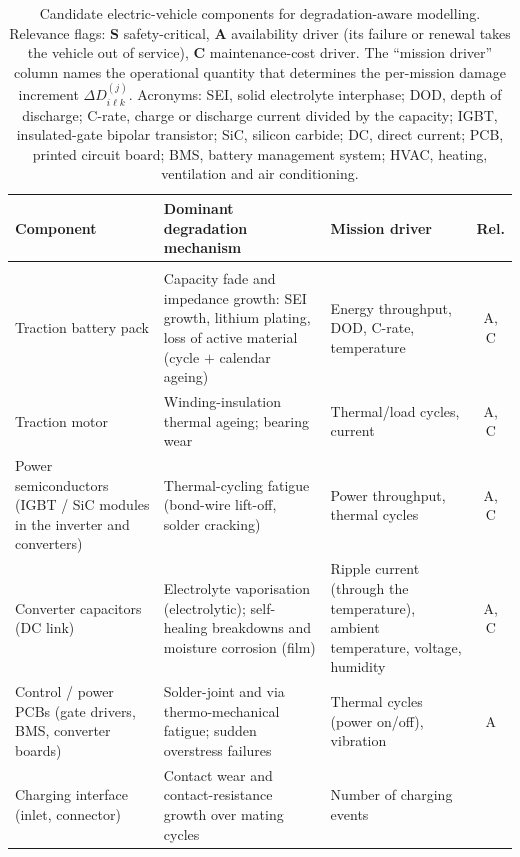 \documentclass[11pt,a4paper]{article}
\theoremstyle{plain}
\theoremstyle{definition}
\theoremstyle{remark}
\begin{document}
\begin{table}[htbp]
\centering
\caption{Candidate electric-vehicle components for degradation-aware modelling.
Relevance flags: \textbf{S} safety-critical, \textbf{A} availability driver (its failure or renewal takes the vehicle out of service), \textbf{C} maintenance-cost driver.
The ``mission driver'' column names the operational quantity that determines the per-mission damage increment $\Delta D^{(j)}_{i\ell k}$.
Acronyms: SEI, solid electrolyte interphase; DOD, depth of discharge; C-rate, charge or discharge current divided by the capacity; IGBT, insulated-gate bipolar transistor; SiC, silicon carbide; DC, direct current; PCB, printed circuit board; BMS, battery management system; HVAC, heating, ventilation and air conditioning.}
\label{tab:ev_components}
\small
\begin{tabularx}{\linewidth}{@{}>{\hsize=0.811\hsize\raggedright\arraybackslash}X>{\hsize=1.243\hsize\raggedright\arraybackslash}X>{\hsize=0.946\hsize\raggedright\arraybackslash}Xc@{}}
\toprule
\rowcolor{headgrey}
\textbf{Component} & \textbf{Dominant degradation mechanism} & \textbf{Mission driver} & \textbf{Rel.} \\
\midrule
\multicolumn{4}{@{}l}{\textit{Electrochemical / electrical powertrain}} \\
Traction battery pack
  & Capacity fade and impedance growth: SEI growth, lithium plating, loss of active material (cycle $+$ calendar ageing)
  & Energy throughput, DOD, C-rate, temperature
  & A, C \\[3pt]
Traction motor
  & Winding-insulation thermal ageing; bearing wear
  & Thermal/load cycles, current
  & A, C \\[3pt]
Power semiconductors (IGBT / SiC modules in the inverter and converters)
  & Thermal-cycling fatigue (bond-wire lift-off, solder cracking)
  & Power throughput, thermal cycles
  & A, C \\[3pt]
Converter capacitors (DC link)
  & Electrolyte vaporisation (electrolytic); self-healing breakdowns and moisture corrosion (film)
  & Ripple current (through the temperature), ambient temperature, voltage, humidity
  & A, C \\[3pt]
Control / power PCBs (gate drivers, BMS, converter boards)
  & Solder-joint and via thermo-mechanical fatigue; sudden overstress failures
  & Thermal cycles (power on/off), vibration
  & A \\[3pt]
Charging interface (inlet, connector)
  & Contact wear and contact-resistance growth over mating cycles
  & Number of charging events

\end{tabularx}
\end{table}
\end{document}
